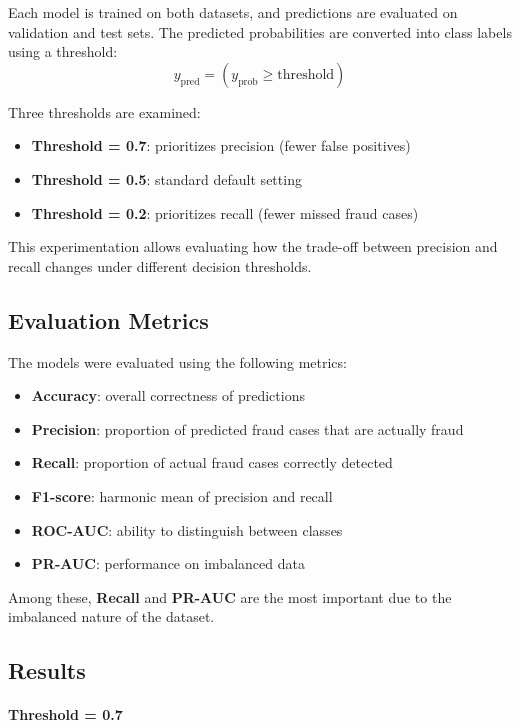 Each model is trained on both datasets, and predictions are evaluated on validation and test sets. The predicted probabilities are converted into class labels using a threshold:
\[
y_{\text{pred}} = (y_{\text{prob}} \geq \text{threshold})
\]

Three thresholds are examined:

\begin{itemize}
    \item \textbf{Threshold = 0.7}: prioritizes precision (fewer false positives)
    \item \textbf{Threshold = 0.5}: standard default setting
    \item \textbf{Threshold = 0.2}: prioritizes recall (fewer missed fraud cases)
\end{itemize}
This experimentation allows evaluating how the trade-off between precision and recall changes under different decision thresholds.



\subsection{Evaluation Metrics}

The models were evaluated using the following metrics:

\begin{itemize}
    \item \textbf{Accuracy}: overall correctness of predictions
    \item \textbf{Precision}: proportion of predicted fraud cases that are actually fraud
    \item \textbf{Recall}: proportion of actual fraud cases correctly detected
    \item \textbf{F1-score}: harmonic mean of precision and recall
    \item \textbf{ROC-AUC}: ability to distinguish between classes
    \item \textbf{PR-AUC}: performance on imbalanced data
\end{itemize}

Among these, \textbf{Recall} and \textbf{PR-AUC} are the most important due to the imbalanced nature of the dataset.



\subsection{Results}

\paragraph*{Threshold = 0.7}

